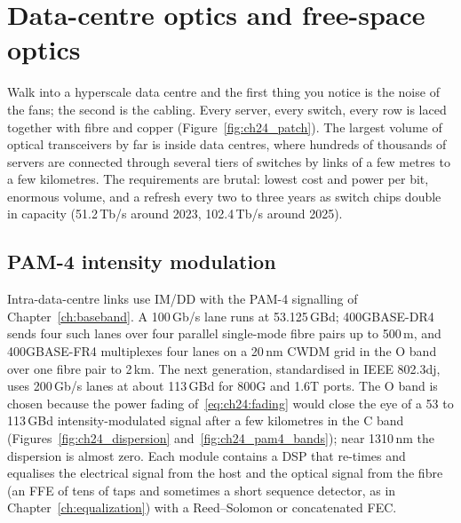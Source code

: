 \section{Data-centre optics and free-space optics}
\label{sec:ch24:dc}

Walk into a hyperscale data centre and the first thing you notice is the noise of the fans; the second
is the cabling. Every server, every switch, every row is laced together with fibre and copper
(Figure~\ref{fig:ch24_patch}). The largest volume of optical transceivers by far is inside data centres,
where hundreds of thousands of servers are connected through several tiers of switches by links of a few
metres to a few kilometres. The requirements are brutal: lowest cost and power per bit, enormous volume,
and a refresh every two to three years as switch chips double in capacity (51.2\,Tb/s around 2023,
102.4\,Tb/s around 2025).



\subsection{PAM-4 intensity modulation}

Intra-data-centre links use IM/DD with the PAM-4 signalling of Chapter~\ref{ch:baseband}. A 100\,Gb/s lane
runs at 53.125\,GBd; 400GBASE-DR4 sends four such lanes over four parallel single-mode fibre pairs up to
500\,m, and 400GBASE-FR4 multiplexes four lanes on a 20\,nm CWDM grid in the O band over one fibre pair to
2\,km. The next generation, standardised in IEEE 802.3dj, uses 200\,Gb/s lanes at about 113\,GBd for 800G
and 1.6T ports. The O band is chosen because the power fading of~\eqref{eq:ch24:fading} would close the eye
of a 53 to 113\,GBd intensity-modulated signal after a few kilometres in the C band
(Figures~\ref{fig:ch24_dispersion} and~\ref{fig:ch24_pam4_bands}); near 1310\,nm the dispersion is almost
zero. Each module contains a DSP that re-times and equalises the electrical signal from the host and the
optical signal from the fibre (an FFE of tens of taps and sometimes a short sequence detector, as in
Chapter~\ref{ch:equalization}) with a Reed--Solomon or concatenated FEC.


